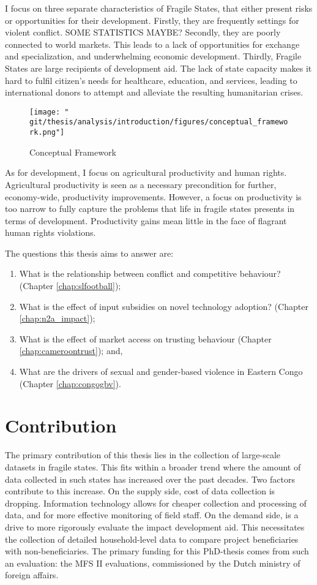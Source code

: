 I focus on three separate characteristics of Fragile States, that either present risks or opportunities for their development. Firstly, they are frequently settings for violent conflict. SOME STATISTICS MAYBE? Secondly, they are poorly connected to world markets. This leads to a lack of opportunities for exchange and specialization, and underwhelming economic development. Thirdly, Fragile States are large recipients of development aid. The lack of state capacity makes it hard to fulfil citizen's needs for healthcare, education, and services, leading to international donors to attempt and alleviate the resulting humanitarian crises.

\begin{figure}[htb]
  \centering
  \texttt{[image: "\\git/thesis/analysis/introduction/figures/conceptual\_framework.png"]}
  \caption{Conceptual Framework}
  \label{fig:intro_framework}
\end{figure}

As for development, I focus on agricultural productivity and human rights. Agricultural productivity is seen as a necessary precondition for further, economy-wide, productivity improvements.  However, a focus on productivity is too narrow to fully capture the problems that life in fragile states presents in terms of development.   Productivity gains mean little in the face of flagrant human rights violations.

The questions this thesis aims to answer are:
\begin{enumerate}
	\item What is the relationship between conflict and competitive behaviour? (Chapter \ref{chap:slfootball});
	\item What is the effect of input subsidies on novel technology adoption? (Chapter \ref{chap:n2a_impact});
	\item What is the effect of market access on trusting behaviour (Chapter \ref{chap:cameroontrust}); and,
	\item What are the drivers of sexual and gender-based violence in Eastern Congo (Chapter \ref{chap:congogbv}).
\end{enumerate}

\section{Contribution}
The primary contribution of this thesis lies in the collection of large-scale datasets in fragile states. This fits within a broader trend where the amount of data collected in such states has increased over the past decades. Two factors contribute to this increase. On the supply side, cost of data collection is dropping. Information technology allows for cheaper collection and processing of data, and for more effective monitoring of field staff. On the demand side, is a drive to more rigorously evaluate the impact development aid. This necessitates the collection of detailed household-level data to compare project beneficiaries with non-beneficiaries. The primary funding for this PhD-thesis comes from such an evaluation: the MFS II evaluations, commissioned by the Dutch ministry of foreign affairs.

